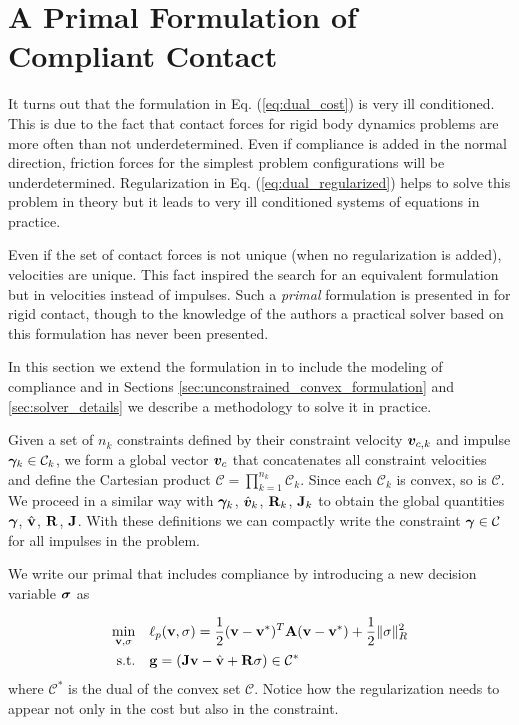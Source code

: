 
\section{A Primal Formulation of Compliant Contact}


It turns out that the formulation in Eq. (\ref{eq:dual_cost}) is very ill
conditioned. This is due to the fact that contact forces for rigid body dynamics
problems are more often than not underdetermined. Even if compliance is added in
the normal direction, friction forces for the simplest problem configurations
will be underdetermined. Regularization in Eq. (\ref{eq:dual_regularized}) helps
to solve this problem in theory but it leads to very ill conditioned systems of
equations in practice. 

Even if the set of contact forces is not unique (when no regularization is
added), velocities are unique. This fact inspired the search for an equivalent
formulation but in velocities instead of impulses. Such a \textit{primal}
formulation is presented in \cite{bib:mazhar2014} for rigid contact, though to
the knowledge of the authors a practical solver based on this formulation has
never been presented.

In this section we extend the formulation in \cite{bib:mazhar2014} to include
the modeling of compliance and in Sections
\ref{sec:unconstrained_convex_formulation} and \ref{sec:solver_details} we
describe a methodology to solve it in practice.

Given a set of $n_k$ constraints defined by their constraint velocity
${\bm{v}}_{c,k}$ and impulse ${\bm\gamma}_k\in\mathcal{C}_k$, we form a global vector
${\bm{v}}_c$ that concatenates all constraint velocities and define the Cartesian
product $\mathcal{C}=\prod_{k=1}^{n_k}\mathcal{C}_k$. Since each $\mathcal{C}_k$
is convex, so is $\mathcal{C}$. We proceed in a similar way with ${\bm\gamma}_k$,
$\hat{{\bm{v}}}_k$, ${\mathbf{R}}_k$, ${\mathbf{J}}_k$ to obtain the global quantities
${\bm\gamma}$, $\hat{{\mathbf{v}}}$, ${\mathbf{R}}$, ${\mathbf{J}}$. With these definitions we can
compactly write the constraint ${\bm\gamma}\in\mathcal{C}$ for all impulses in the
problem.

We write our primal that includes compliance by introducing a new decision
variable ${\bm{\sigma}}$ as

\begin{equation}
	\begin{aligned}
	\min_{\mf{v},\mf{\sigma}} \quad & \ell_p(\mf{v},\mf{\sigma}) = \frac{1}{2}(\mf{v}-\mf{v}^*)^T\mf{A}(\mf{v}-\mf{v}^*) + \frac{1}{2} \Vert\mf\sigma\Vert_{R}^2\\
	\textrm{s.t.} \quad & \mf{g} = (\mf{J}\mf{v}-\hat{\mf{v}} + \mf{R}\mf\sigma) \in \mathcal{C}^*\\
	\end{aligned}
	\label{eq:primal_regularized}
\end{equation}
where $\mathcal{C}^*$ is the dual of the convex set $\mathcal{C}$. Notice how
the regularization needs to appear not only in the cost but also in the
constraint. 

